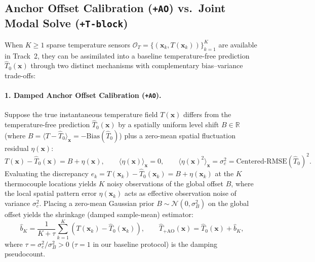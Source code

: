 \subsection{Anchor Offset Calibration (\texttt{+AO}) vs.\ Joint Modal Solve (\texttt{+T-block})}
\label{subsec:bg_anchor_offset}

When $K \ge 1$ sparse temperature sensors $\mathcal{O}_T = \{(\mathbf{x}_k, T(\mathbf{x}_k))\}_{k=1}^K$ are available in Track~2, they can be assimilated into a baseline temperature-free prediction $\hat{T}_0(\mathbf{x})$ through two distinct mechanisms with complementary bias--variance trade-offs:

\paragraph{1. Damped Anchor Offset Calibration (\texttt{+AO}).}
Suppose the true instantaneous temperature field $T(\mathbf{x})$ differs from the temperature-free prediction $\hat{T}_0(\mathbf{x})$ by a spatially uniform level shift $B \in \mathbb{R}$ (where $B = \langle T - \hat{T}_0 \rangle_{\mathbf{x}} = -\text{Bias}(\hat{T}_0)$) plus a zero-mean spatial fluctuation residual $\eta(\mathbf{x})$:
\begin{equation}
    T(\mathbf{x}) - \hat{T}_0(\mathbf{x}) = B + \eta(\mathbf{x}), \qquad \langle \eta(\mathbf{x}) \rangle_{\mathbf{x}} = 0, \qquad \langle \eta(\mathbf{x})^2 \rangle_{\mathbf{x}} = \sigma_c^2 = \text{Centered-RMSE}(\hat{T}_0)^2.
    \label{eq:bg_error_decomp_model}
\end{equation}
Evaluating the discrepancy $e_k = T(\mathbf{x}_k) - \hat{T}_0(\mathbf{x}_k) = B + \eta(\mathbf{x}_k)$ at the $K$ thermocouple locations yields $K$ noisy observations of the global offset $B$, where the local spatial pattern error $\eta(\mathbf{x}_k)$ acts as effective observation noise of variance $\sigma_c^2$. Placing a zero-mean Gaussian prior $B \sim \mathcal{N}(0, \sigma_B^2)$ on the global offset yields the shrinkage (damped sample-mean) estimator:
\begin{equation}
    \hat{b}_K = \frac{1}{K + \tau} \sum_{k=1}^K \left(T(\mathbf{x}_k) - \hat{T}_0(\mathbf{x}_k)\right), \qquad \hat{T}_{\text{+AO}}(\mathbf{x}) = \hat{T}_0(\mathbf{x}) + \hat{b}_K,
    \label{eq:bg_anchor_offset_def}
\end{equation}
where $\tau = \sigma_c^2 / \sigma_B^2 > 0$ ($\tau = 1$ in our baseline protocol) is the damping pseudocount.

